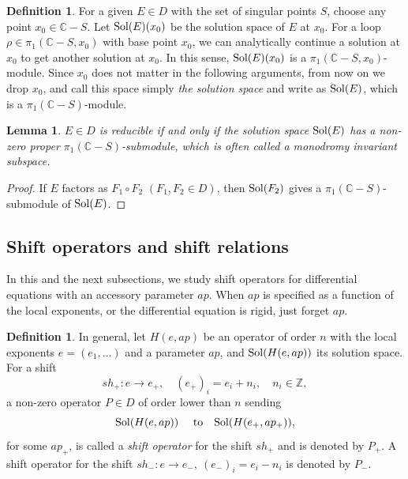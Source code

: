 \documentclass[a4paper,12pt]{article}
\newtheorem{lemma}[thm]{Lemma}
\theoremstyle{definition}
\newtheorem{dfn}[thm]{Definition}
\theoremstyle{remark}
\numberwithin{equation}{section} %
\begin{document}
\begin{dfn}\label{solutionspace}
  For a given $E\in D$ with the set of singular points $S$, choose any point $x_0\in \mathbb{C}-S$. Let ${\rm Sol}(E)(x_0)$ be the solution space of $E$ at $x_0$.  For a loop $\rho\in \pi_1(\mathbb{C}-S,x_0)$ with base point $x_0$, we can analytically continue a solution at $x_0$ to get another solution at $x_0$. In this sense, ${\rm Sol}(E)(x_0)$ is a $\pi_1(\mathbb{C}-S,x_0)$-module. Since $x_0$ does not matter in the following arguments, from now on we drop $x_0$, and call this space simply {\it the solution space} and write as ${\rm Sol}(E)$, which is a  $\pi_1(\mathbb{C}-S)$-module.
\end{dfn}

\begin{lemma}\label{monodinv} $E\in D$ is reducible if and only if the solution space ${\rm Sol}(E)$ has a non-zero proper  $\pi_1(\mathbb{C}-S)$-submodule, which is often called a monodromy invariant subspace.
\end{lemma}
\begin{proof}
If $E$ factors as $F_1\circ F_2$ $(F_1,F_2\in D)$, then ${\rm Sol}(F_2)$
gives a $\pi_1(\mathbb{C}-S)$-submodule of  ${\rm Sol}(E)$.
\end{proof} %

\subsection{Shift operators and shift relations}\label{GenShiftShift}
In this and the next subsections, we study shift operators for  differential equations with an accessory parameter $ap$. When $ap$ is specified as a function of the local exponents, or the differential equation is rigid, just forget $ap$.
\begin{dfn}\label{DefShift}In general,
  let $H(e,ap)$ be an operator of order $n$
  with the local exponents $e=(e_1,\dots)$ and a  parameter $ap$, and ${\rm Sol}(H(e,ap))$ its solution space. For a shift 
$$sh_+:e\to e_+,\quad (e_+)_i=e_i+n_i,\quad n_i\in\mathbb{Z},$$
  a non-zero operator $P\in D$ of order lower than $n$   sending 
$${\rm Sol}(H(e,ap))\quad \ {\rm to} \quad {\rm Sol}(H(e_+,ap_+)),$$
for some $ap_+$, is called
  a {\it shift operator} for the shift $sh_+$ 
  and is denoted by $P_{+}$. A shift operator for the shift 
$sh_-:e\to e_-,\ (e_-)_i=e_i-n_i$   is denoted by $P_{-}$.
\end{dfn}
\end{document}
